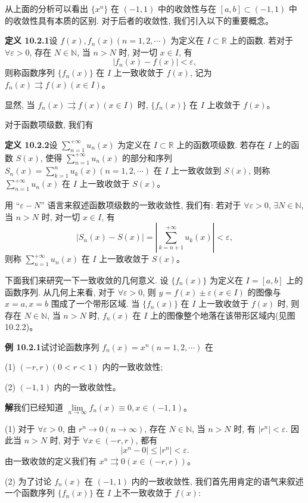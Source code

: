 \documentclass[UTF8, 12pt, fontset=fandol, oneside]{ctexart}
\begin{document}
从上面的分析可以看出 $\{x^n\}$ 在 $(-1,1)$ 中的收敛性与在 $[a,b]\subset(-1,1)$ 中的收敛性具有本质的区别. 对于后者的收敛性, 我们引入以下的重要概念。

\noindent\textbf{定义 10.2.1}\quad 设 $f(x),f_n(x)(n=1,2,\cdots)$ 为定义在 $I\subset\mathbb R$ 上的函数. 若对于 $\forall\varepsilon>0$, 存在 $N\in\mathbb N$, 当 $n>N$ 时, 对一切 $x\in I$, 有
\[
  |f_n(x)-f(x)|<\varepsilon,
\]
则称函数序列 $\{f_n(x)\}$ 在 $I$ 上一致收敛于 $f(x)$, 记为 $f_n(x)\rightrightarrows f(x)(x\in I)$。

显然, 当 $f_n(x)\rightrightarrows f(x)(x\in I)$ 时, $\{f_n(x)\}$ 在 $I$ 上收敛于 $f(x)$。

对于函数项级数, 我们有

\noindent\textbf{定义 10.2.2}\quad 设 $\sum\limits_{n=1}^{+\infty}u_n(x)$ 为定义在 $I\subset\mathbb R$ 上的函数项级数. 若存在 $I$ 上的函数 $S(x)$, 使得 $\sum\limits_{n=1}^{+\infty}u_n(x)$ 的部分和序列 $S_n(x)=\sum\limits_{k=1}^n u_k(x)(n=1,2,\cdots)$ 在 $I$ 上一致收敛到 $S(x)$, 则称 $\sum\limits_{n=1}^{+\infty}u_n(x)$ 在 $I$ 上一致收敛于 $S(x)$。

用 ``$\varepsilon-N$'' 语言来叙述函数项级数的一致收敛性, 我们有: 若对于 $\forall\varepsilon>0$, $\exists N\in\mathbb N$, 当 $n>N$ 时, 对一切 $x\in I$, 有
\[
  |S_n(x)-S(x)|=\left|\sum_{k=n+1}^{+\infty}u_k(x)\right|<\varepsilon,
\]
则称 $\sum\limits_{n=1}^{+\infty}u_n(x)$ 在 $I$ 上一致收敛于 $S(x)$。

下面我们来研究一下一致收敛的几何意义. 设 $\{f_n(x)\}$ 为定义在 $I=[a,b]$ 上的函数序列. 从几何上来看, 对于 $\forall\varepsilon>0$, 则 $y=f(x)\pm\varepsilon(x\in I)$ 的图像与 $x=a,x=b$ 围成了一个带形区域. 当 $\{f_n(x)\}$ 在 $I$ 上一致收敛于 $f(x)$ 时, 则存在 $N\in\mathbb N$, 当 $n>N$ 时, $f_n(x)$ 在 $I$ 上的图像整个地落在该带形区域内(见图 10.2.2)。

\noindent\textbf{例 10.2.1}\quad 试讨论函数序列 $f_n(x)=x^n(n=1,2,\cdots)$ 在

(1) $(-r,r)(0<r<1)$ 内的一致收敛性;

(2) $(-1,1)$ 内的一致收敛性。

\noindent\textbf{解}\quad 我们已经知道 $\lim\limits_{n\to\infty}f_n(x)\equiv0,x\in(-1,1)$。

(1) 对于 $\forall\varepsilon>0$, 由 $r^n\to0(n\to\infty)$, 存在 $N\in\mathbb N$, 当 $n>N$ 时, 有 $|r^n|<\varepsilon$. 因此当 $n>N$ 时, 对于 $\forall x\in(-r,r)$, 都有
\[
  |x^n-0|\leq |r^n|<\varepsilon.
\]
由一致收敛的定义我们有 $x^n\rightrightarrows0(x\in(-r,r))$。

(2) 为了讨论 $f_n(x)$ 在 $(-1,1)$ 内的一致收敛性, 我们首先用肯定的语气来叙述一个函数序列 $\{f_n(x)\}$ 在 $I$ 上不一致收敛于 $f(x)$:
\end{document}
